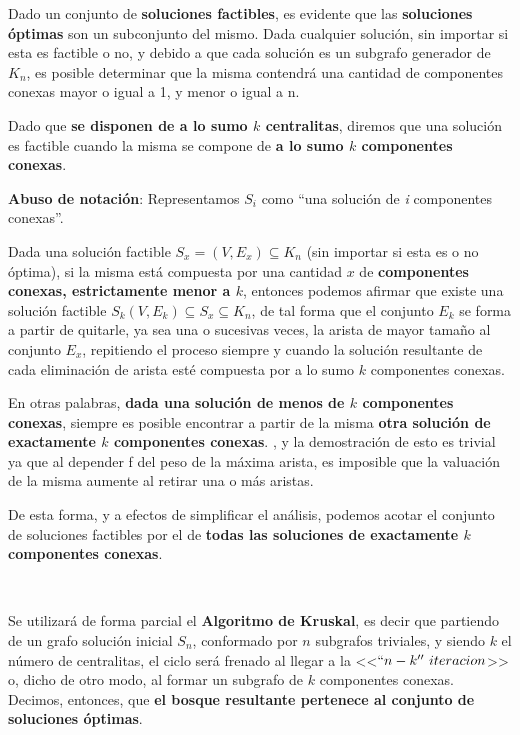 \documentclass[11pt, a4paper, twoside]{article}
\begin{document}
\begin{samepage}

Dado un conjunto de \textbf{soluciones factibles}, es evidente que las \textbf{soluciones óptimas}
son un subconjunto del mismo. Dada cualquier solución, sin importar si esta es factible o no, y
debido a que cada solución es un subgrafo generador de $K_{n}$, es posible determinar que la misma
contendrá una cantidad de componentes conexas mayor o igual a 1, y menor o igual a n. \nopagebreak

Dado que \textbf{se disponen de a lo sumo $k$ centralitas}, diremos que una solución es factible
cuando la misma se compone de \textbf{a lo sumo $k$ componentes conexas}.\nopagebreak

\textbf{Abuso de notación}: Representamos $S_{i}$ como ``una solución de \emph{i} componentes conexas''.\nopagebreak

Dada una solución factible $S_{x} = (V, E_{x}) \subseteq K_{n}$ (sin importar si esta es o no
óptima), si la misma está compuesta por una cantidad $x$ de \textbf{componentes conexas,
estrictamente menor a $k$}, entonces podemos afirmar que existe una solución factible $S_{k} (V,
E_{k}) \subseteq S_{x} \subseteq K_{n}$, de tal forma que el conjunto $E_{k}$ se forma a partir de
quitarle, ya sea una o sucesivas veces, la arista de mayor tamaño al conjunto $E_{x}$, repitiendo el
proceso siempre y cuando la solución resultante de cada eliminación de arista esté compuesta por a
lo sumo $k$ componentes conexas.

En otras palabras, \textbf{dada una solución de menos de $k$ componentes conexas}, siempre es
posible encontrar a partir de la misma \textbf{otra solución de exactamente $k$ componentes
conexas}. , y la demostración de esto
es trivial ya que al depender f del peso de la máxima arista, es imposible que la valuación de la
misma aumente al retirar una o más aristas.

De esta forma, y a efectos de simplificar el análisis, podemos acotar el conjunto de soluciones
factibles por el de \textbf{todas las soluciones de exactamente $k$ componentes conexas}.

\end{samepage}

\begin{paragraph}\

Se utilizará de forma parcial el \textbf{Algoritmo de Kruskal}, es decir que partiendo de un grafo solución
inicial $S_{n}$, conformado por $n$ subgrafos triviales, y siendo $k$ el número de centralitas, el
ciclo será frenado al llegar a la <<$``n-k''~iteracion$>> o, dicho de otro modo, al formar un
subgrafo de $k$ componentes conexas. Decimos, entonces, que \textbf{el bosque resultante pertenece al
conjunto de soluciones óptimas}.
\end{paragraph}
\end{document}
